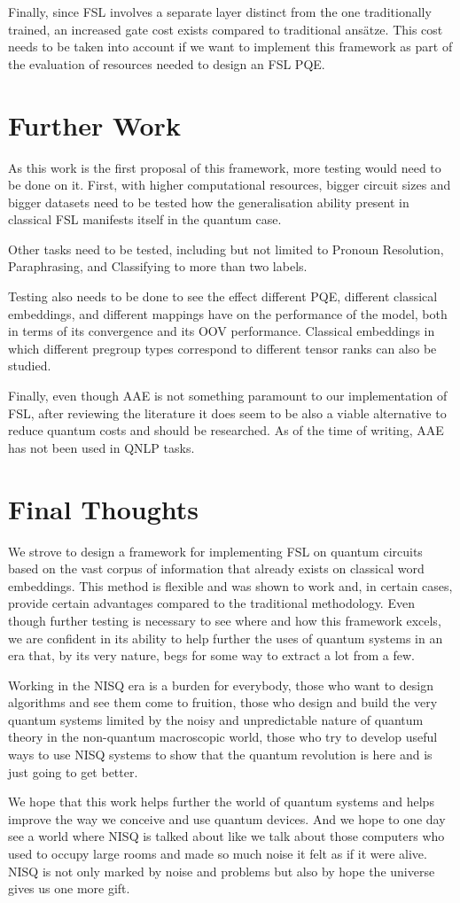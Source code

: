 Finally, since FSL involves a separate layer distinct from the one traditionally trained, an increased gate cost exists compared to traditional ans{\"a}tze. This cost needs to be taken into account if we want to implement this framework as part of the evaluation of resources needed to design an FSL PQE.

\section{Further Work}
As this work is the first proposal of this framework, more testing would need to be done on it. First, with higher computational resources, bigger circuit sizes and bigger datasets need to be tested how the generalisation ability present in classical FSL manifests itself in the quantum case. 

Other tasks need to be tested, including but not limited to  Pronoun Resolution, Paraphrasing, and Classifying to more than two labels. 

Testing also needs to be done to see the effect different PQE, different classical embeddings, and different mappings have on the performance of the model, both in terms of its convergence and its OOV performance. Classical embeddings in which different pregroup types correspond to different tensor ranks can also be studied.

Finally, even though AAE is not something paramount to our implementation of FSL, after reviewing the literature it does seem to be also a viable alternative to reduce quantum costs and should be researched. As of the time of writing, AAE has not been used in QNLP tasks.

\section{Final Thoughts}

We strove to design a framework for implementing FSL on quantum circuits based on the vast corpus of information that already exists on classical word embeddings. This method is flexible and was shown to work and, in certain cases, provide certain advantages compared to the traditional methodology. Even though further testing is necessary to see where and how this framework excels, we are confident in its ability to help further the uses of quantum systems in an era that, by its very nature, begs for some way to extract a lot from a few.

Working in the NISQ era is a burden for everybody, those who want to design algorithms and see them come to fruition, those who design and build the very quantum systems limited by the noisy and unpredictable nature of quantum theory in the non-quantum macroscopic world, those who try to develop useful ways to use NISQ systems to show that the quantum revolution is here and is just going to get better.

We hope that this work helps further the world of quantum systems and helps improve the way we conceive and use quantum devices. And we hope to one day see a world where NISQ is talked about like we talk about those computers who used to occupy large rooms and made so much noise it felt as if it were alive. NISQ is not only marked by noise and problems but also by hope the universe gives us one more gift.